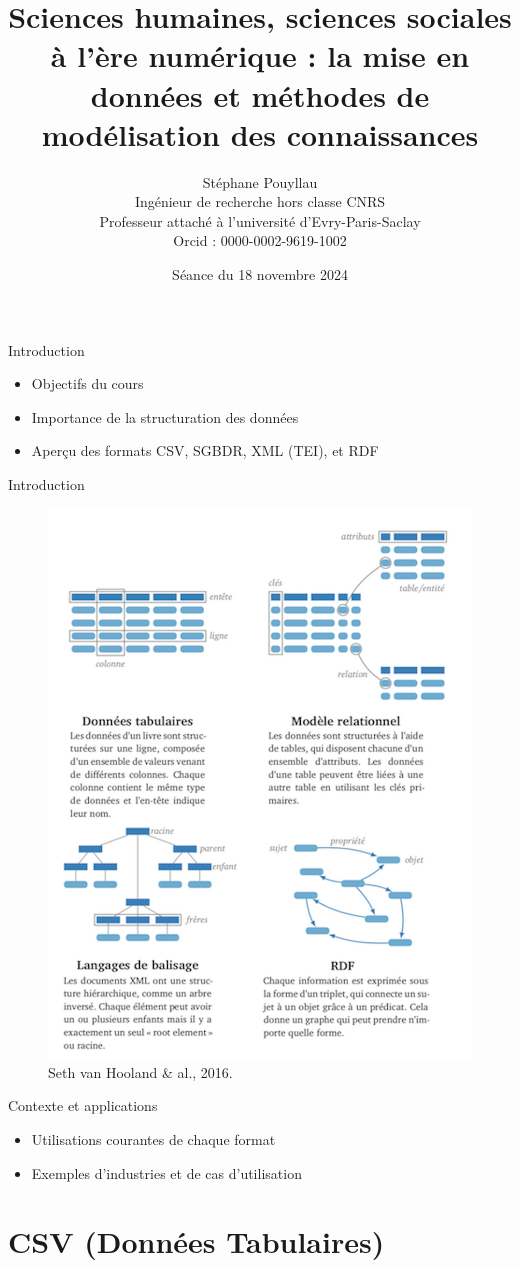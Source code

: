 \documentclass{beamer}
\title{Sciences humaines, sciences sociales à l'ère numérique : la mise en données et méthodes de modélisation des connaissances}
\author{Stéphane Pouyllau\\ \small{Ingénieur de recherche hors classe CNRS}\\ \small{Professeur attaché à l'université d'Evry-Paris-Saclay}\\ \small{Orcid : 0000-0002-9619-1002}}
\date{Séance du 18 novembre 2024}
\begin{document}
\begin{frame}
    \titlepage
\end{frame}

\begin{frame}{Introduction}
    \begin{itemize}
        \item Objectifs du cours
        \item Importance de la structuration des données
        \item Aperçu des formats CSV, SGBDR, XML (TEI), et RDF
    \end{itemize}
\end{frame}

\begin{frame}{Introduction}
    \begin{figure}
    \centering
    \includegraphics[width=0.5\linewidth]{fig/Setl.png}
    \caption{Seth van Hooland \& al., 2016.}
    \label{fig:enter-label}
\end{figure}
\end{frame}

\begin{frame}{Contexte et applications}
    \begin{itemize}
        \item Utilisations courantes de chaque format
        \item Exemples d'industries et de cas d'utilisation
    \end{itemize}
\end{frame}

\section{CSV (Données Tabulaires)}
\end{document}
